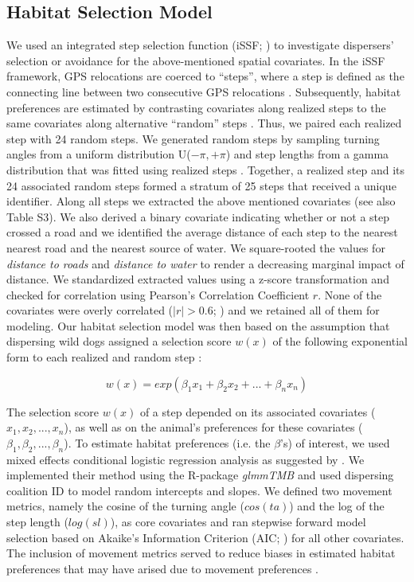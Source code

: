 \documentclass[abstract=on,10pt,a4paper,bibliography=totocnumbered]{article}
\begin{document}
\subsection{Habitat Selection Model}
We used an integrated step selection function (iSSF; \citealp{Avgar.2016}) to
investigate dispersers' selection or avoidance for the above-mentioned spatial
covariates. In the iSSF framework, GPS relocations are coerced to  ``steps'',
where a step is defined as the connecting line between two consecutive GPS
relocations \citep{Turchin.1998}. Subsequently, habitat preferences are
estimated by contrasting covariates along realized steps to the same covariates
along alternative ``random''  steps \citep{Fortin.2005, Thurfjell.2014,
Avgar.2016}. Thus, we paired each realized step with 24 random steps. We
generated random steps by sampling turning angles from a uniform distribution
U(\(-\pi, +\pi\)) and step lengths from a gamma distribution that was fitted
using realized steps \citep{Avgar.2016}. Together, a realized step and its 24
associated random steps formed a stratum of 25 steps that received a unique
identifier. Along all steps we extracted the above mentioned covariates (see
also Table S3). We also derived a binary covariate indicating whether or not a
step crossed a road and we identified the average distance of each step to the
nearest nearest road and the nearest source of water. We square-rooted the
values for \textit{distance to roads} and \textit{distance to water} to render a
decreasing marginal impact of distance. We standardized extracted values using a
z-score transformation and checked for correlation using Pearson's Correlation
Coefficient \(r\). None of the covariates were overly correlated (\(|r| > 0.6\);
\citealp{Latham.2011}) and we retained all of them for modeling. Our habitat
selection model was then based on the assumption that dispersing wild dogs
assigned a selection score \(w(x)\) of the following exponential form to each
realized and random step \citep{Fortin.2005, Thurfjell.2014, Avgar.2016}:

\begin{equation}
\label{EQ1}
  w(x) = exp(\beta_1 x_1 + \beta_2 x_2 + ... + \beta_n x_n)
\end{equation}

\noindent The selection score \(w(x)\) of a step depended on its associated
covariates (\(x_1, x_2, ..., x_n\)), as well as on the animal's preferences for
these covariates (\(\beta_1, \beta_2, ..., \beta_n\)). To estimate habitat
preferences (i.e. the \(\beta\)'s) of interest, we used mixed effects
conditional logistic regression analysis as suggested by \cite{Muff.2020}. We
implemented their method using the R-package \textit{glmmTMB}
\citep{Mollie.2017} and used dispersing coalition ID to model random intercepts
and slopes. We defined two movement metrics, namely the cosine of the turning
angle (\(cos(ta)\)) and the log of the step length (\(log(sl)\)), as core
covariates and ran stepwise forward model selection based on Akaike's
Information Criterion (AIC; \citealp{Burnham.2002}) for all other covariates.
The inclusion of movement metrics served to reduce biases in estimated habitat
preferences that may have arised due to movement preferences \citep{Avgar.2016}.
\end{document}
